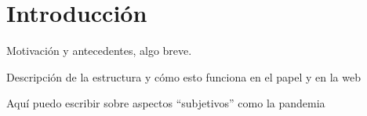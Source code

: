 \chapter{Introducción}

Motivación y antecedentes, algo breve.

Descripción de la estructura y cómo esto funciona en el papel y en la web 

Aquí puedo escribir sobre aspectos ``subjetivos'' como la pandemia 
